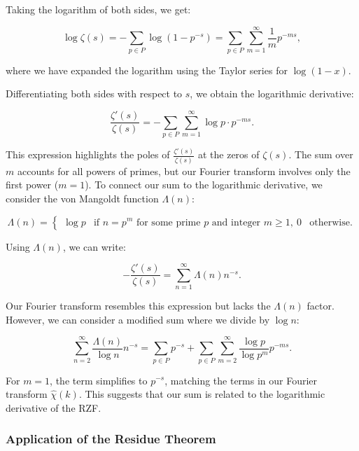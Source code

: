 \documentclass[11pt, oneside]{article}
\begin{document}
Taking the logarithm of both sides, we get:

\begin{equation} \log \zeta(s) = -\sum_{p \in P} \log\left(1 - p^{-s}\right) = \sum_{p \in P} \sum_{m=1}^\infty \frac{1}{m} p^{-m s}, \end{equation}

where we have expanded the logarithm using the Taylor series for $\log(1 - x)$.

Differentiating both sides with respect to $s$, we obtain the logarithmic derivative:

\begin{equation} \frac{\zeta'(s)}{\zeta(s)} = -\sum_{p \in P} \sum_{m=1}^\infty \log p \cdot p^{-m s}. \end{equation}

This expression highlights the poles of $\frac{\zeta'(s)}{\zeta(s)}$ at the zeros of $\zeta(s)$. The sum over $m$ accounts for all powers of primes, but our Fourier transform involves only the first power ($m = 1$). To connect our sum to the logarithmic derivative, we consider the von Mangoldt function $\Lambda(n)$:

\begin{equation} \Lambda(n) = \begin{cases} \log p & \text{if } n = p^m \text{ for some prime } p \text{ and integer } m \geq 1, \ 0 & \text{otherwise}. \end{cases} \end{equation}

Using $\Lambda(n)$, we can write:

\begin{equation} -\frac{\zeta'(s)}{\zeta(s)} = \sum_{n=1}^\infty \Lambda(n) n^{-s}. \end{equation}

Our Fourier transform resembles this expression but lacks the $\Lambda(n)$ factor. However, we can consider a modified sum where we divide by $\log n$:

\begin{equation} \sum_{n=2}^\infty \frac{\Lambda(n)}{\log n} n^{-s} = \sum_{p \in P} p^{-s} + \sum_{p \in P} \sum_{m=2}^\infty \frac{\log p}{\log p^m} p^{-m s}. \end{equation}

For $m = 1$, the term simplifies to $p^{-s}$, matching the terms in our Fourier transform $\hat{\chi}(k)$. This suggests that our sum is related to the logarithmic derivative of the RZF.

\subsubsection{Application of the Residue Theorem}
\end{document}
